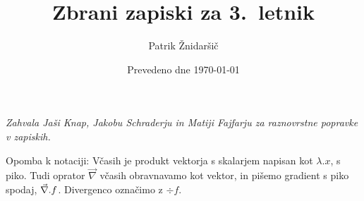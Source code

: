 \documentclass[titlepage]{scrbook}
\title{Zbrani zapiski za 3.\ letnik}
\date{Prevedeno dne \today}
\author{Patrik Žnidaršič}
\begin{document}
\maketitle

\textit{Zahvala Jaši Knap, Jakobu Schraderju in Matiji Fajfarju za raznovrstne
  popravke v zapiskih.}
\newpage

Opomba k notaciji:
Včasih je produkt vektorja s skalarjem napisan kot $\lambda . x$, s piko.
Tudi oprator $\vec{\nabla}$ včasih obravnavamo kot vektor, in pišemo gradient s
piko spodaj, $\vec{\nabla}{} . f$.
Divergenco označimo z $\div f$.
\newpage

\tableofcontents
\newpage


% 


















\end{document}
